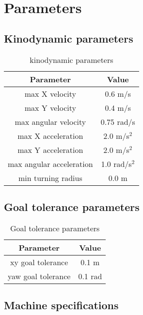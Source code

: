 \chapter{Parameters}
\label{appendix_parameters}

\section{Kinodynamic parameters}%
\label{sec:kinodynamic_parameters}

\begin{table}[H]
    \centering
    \begin{tabular}{cc}
        \textbf{Parameter} & \textbf{Value} \\\toprule
        max X velocity & 0.6 m/s \\
        max Y velocity & 0.4 m/s \\
        max angular velocity & 0.75 rad/s \\
        max X acceleration & 2.0 m/s$^2$ \\
        max Y acceleration & 2.0 m/s$^2$ \\
        max angular acceleration & 1.0 rad/s$^2$\\
        min turning radius & 0.0 m \\
    \end{tabular}
    \caption{kinodynamic parameters}\label{tab:kinodynamic_parameters}
\end{table}


\section{Goal tolerance parameters}%
\label{sec:goal_tolerance_parameters}

\begin{table}[H]
    \centering
    \begin{tabular}{cc}
        \textbf{Parameter} & \textbf{Value} \\\toprule
        xy goal tolerance & 0.1 m \\
        yaw goal tolerance & 0.1 rad \\
    \end{tabular}
    \caption{Goal tolerance parameters}\label{tab:goa_tolerance_parameters}
\end{table}

\section{Machine specifications}%
\label{sec:machine_specifications}

